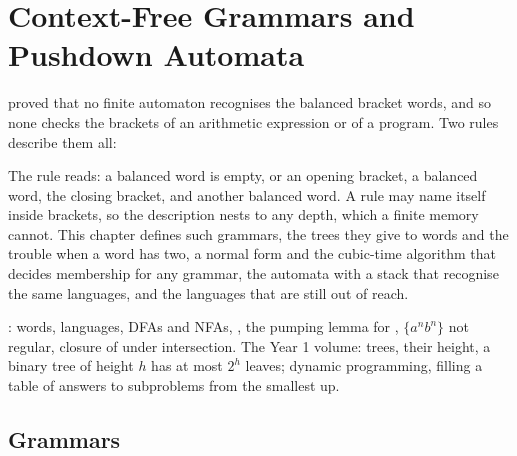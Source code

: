 \chapter{Context-Free Grammars and Pushdown Automata}\label{ch:b2:context-free-languages}

 proved that no finite automaton recognises the balanced bracket words, and so none
checks the brackets of an arithmetic expression or of a program. Two rules describe them all:

\label{lst:b2:context-free-languages:hook}

\label{out:b2:context-free-languages:hook}

The rule reads: a balanced word is empty, or an opening bracket, a balanced word, the closing bracket, and another
balanced word. A rule may name itself inside brackets, so the description nests to any depth, which a finite memory
cannot. This chapter defines such grammars, the trees they give to words and the trouble when a word has two, a normal
form and the cubic-time algorithm that decides membership for any grammar, the automata with a stack that recognise
the same languages, and the languages that are still out of reach.

\begin{recall}
: words, languages, DFAs and NFAs, , the
pumping lemma for , $\{a^nb^n\}$ not regular, closure of  under intersection. The
Year 1 volume: trees, their height, a binary tree of height $h$ has at most $2^h$ leaves; dynamic programming, filling a
table of answers to subproblems from the smallest up.
\end{recall}

\section{Grammars}\label{sec:b2:context-free-languages:grammars}

